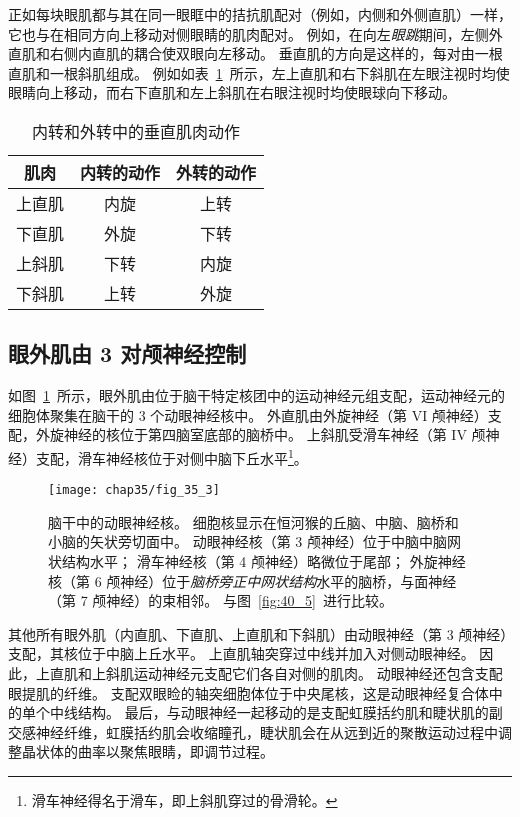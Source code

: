 正如每块眼肌都与其在同一眼眶中的拮抗肌配对（例如，内侧和外侧直肌）一样，它也与在相同方向上移动对侧眼睛的肌肉配对。
例如，在向左\textit{眼跳}期间，左侧外直肌和右侧内直肌的耦合使双眼向左移动。
垂直肌的方向是这样的，每对由一根直肌和一根斜肌组成。
例如如表~\ref{tab:35_1}~所示，左上直肌和右下斜肌在左眼注视时均使眼睛向上移动，而右下直肌和左上斜肌在右眼注视时均使眼球向下移动。


\begin{table}[htbp]
	\caption{内转和外转中的垂直肌肉动作\label{tab:35_1}}
	\centering
	\begin{tabular}{ccc}
		\toprule
		肌肉 & 内转的动作 
		& 外转的动作 \\
		\midrule
		上直肌 & 内旋  & 上转 \\
		下直肌      & 外旋 	& 下转 \\
		上斜肌      & 下转 	& 内旋 \\
		下斜肌      & 上转 	& 外旋 \\
		\bottomrule
	\end{tabular}
\end{table}



\subsection{眼外肌由 3 对颅神经控制}

如图~\ref{fig:35_3}~所示，眼外肌由位于脑干特定核团中的运动神经元组支配，运动神经元的细胞体聚集在脑干的 3 个动眼神经核中。
外直肌由外旋神经（第 VI 颅神经）支配，外旋神经的核位于第四脑室底部的脑桥中。
上斜肌受滑车神经（第 IV 颅神经）支配，滑车神经核位于对侧中脑下丘水平\footnote{滑车神经得名于滑车，即上斜肌穿过的骨滑轮。}。


\begin{figure}[htbp]
	\centering
	\texttt{[image: chap35/fig\_35\_3]}
	\caption{脑干中的动眼神经核。
		细胞核显示在恒河猴的丘脑、中脑、脑桥和小脑的矢状旁切面中。
		动眼神经核（第 3 颅神经）位于中脑中脑网状结构水平；
		滑车神经核（第 4 颅神经）略微位于尾部；
		外旋神经核（第 6 颅神经）位于\textit{脑桥旁正中网状结构}水平的脑桥，与面神经（第 7 颅神经）的束相邻\cite{henn1982primate}。
		与图~\ref{fig:40_5}~进行比较。}
	\label{fig:35_3}
\end{figure}


其他所有眼外肌（内直肌、下直肌、上直肌和下斜肌）由动眼神经（第 3 颅神经）支配，其核位于中脑上丘水平。
上直肌轴突穿过中线并加入对侧动眼神经。
因此，上直肌和上斜肌运动神经元支配它们各自对侧的肌肉。
动眼神经还包含支配眼提肌的纤维。
支配双眼睑的轴突细胞体位于中央尾核，这是动眼神经复合体中的单个中线结构。
最后，与动眼神经一起移动的是支配虹膜括约肌和睫状肌的副交感神经纤维，虹膜括约肌会收缩瞳孔，睫状肌会在从远到近的聚散运动过程中调整晶状体的曲率以聚焦眼睛，即调节过程。


